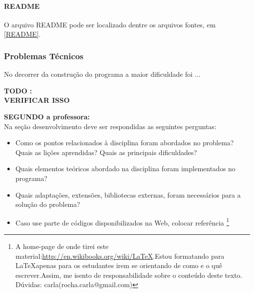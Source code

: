\paragraph{\textbf{README}}

O arquivo README pode ser localizado dentre os arquivos fontes, em \ref{README}.

\subsubsection{Problemas Técnicos}\label{problens}

No decorrer da construção do programa a maior dificuldade foi ...

\textbf{TODO :\\ VERIFICAR ISSO}

\textbf{SEGUNDO a professora:\\}
Na seção desenvolvimento deve ser respondidas as seguintes perguntas:
 
	\begin{itemize}
	 	\item Como os pontos relacionados à disciplina foram abordados no problema? Quais as lições aprendidas? Quais as principais dificuldades?
	 	\item Quais elementos teóricos abordado na disciplina foram implementados no programa?
	 	\item Quais adaptações, extensões, bibliotecas externas, foram necessários para a solução do problema?
	 	\item Caso use parte de códigos disponibilizados na Web, colocar referência \footnote{A home-page de onde tirei
este material:\url{http://en.wikibooks.org/wiki/LaTeX}.Estou formatando para \LaTeX apenas para os estudantes irem se orientando de como e o quê escrever.Assim, me isento de responsabilidade sobre o conteúdo deste texto. Dúvidas: carla(rocha.carla@gmail.com)}
	\end{itemize}


